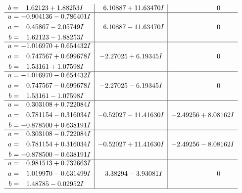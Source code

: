 \documentclass[1p]{elsarticle_modified}
\theoremstyle{definition}
\begin{document}
$$\begin{array}{c|c|c}
\begin{aligned}
b &= \phantom{-}1.62123 + 1.88253 I\end{aligned}
 & \phantom{-}6.10887 + 11.63470 I & \phantom{-0.000000 } 0 \\ \hline\begin{aligned}
u &= -0.904136 - 0.786401 I \\
a &= \phantom{-}0.45867 - 2.05749 I \\
b &= \phantom{-}1.62123 - 1.88253 I\end{aligned}
 & \phantom{-}6.10887 - 11.63470 I & \phantom{-0.000000 } 0 \\ \hline\begin{aligned}
u &= -1.016970 + 0.654432 I \\
a &= \phantom{-}0.747567 + 0.699678 I \\
b &= \phantom{-}1.53161 + 1.07598 I\end{aligned}
 & -2.27025 + 6.19345 I & \phantom{-0.000000 } 0 \\ \hline\begin{aligned}
u &= -1.016970 - 0.654432 I \\
a &= \phantom{-}0.747567 - 0.699678 I \\
b &= \phantom{-}1.53161 - 1.07598 I\end{aligned}
 & -2.27025 - 6.19345 I & \phantom{-0.000000 } 0 \\ \hline\begin{aligned}
u &= \phantom{-}0.303108 + 0.722084 I \\
a &= \phantom{-}0.781154 - 0.316034 I \\
b &= -0.878500 + 0.638191 I\end{aligned}
 & -0.52027 - 11.41630 I & -2.49256 + 8.08162 I \\ \hline\begin{aligned}
u &= \phantom{-}0.303108 - 0.722084 I \\
a &= \phantom{-}0.781154 + 0.316034 I \\
b &= -0.878500 - 0.638191 I\end{aligned}
 & -0.52027 + 11.41630 I & -2.49256 - 8.08162 I \\ \hline\begin{aligned}
u &= \phantom{-}0.981513 + 0.732663 I \\
a &= \phantom{-}1.019970 - 0.631499 I \\
b &= \phantom{-}1.48785 - 0.02952 I\end{aligned}
 & \phantom{-}3.38294 - 3.93081 I & \phantom{-0.000000 } 0\\
 \hline 

\end{array}$$
\end{document}
